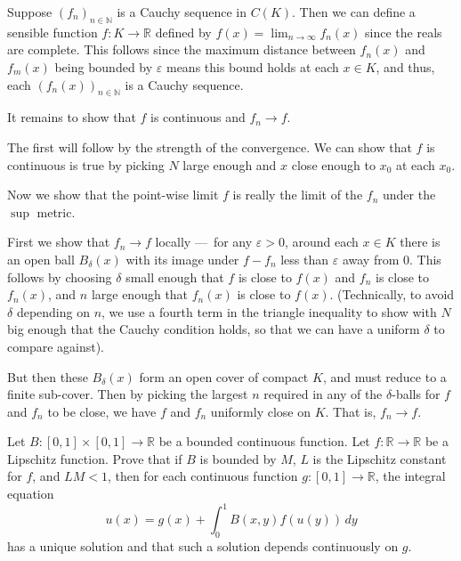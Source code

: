 \documentclass[12 pt, letterpaper]{hmcpset}
\begin{document}
\begin{solution}
	Suppose $(f_{n} )_{n \in \mathbb{N}}$ is a Cauchy sequence in $C(K)$. Then we can define a sensible function $f : K \to \mathbb{R}$ defined by $f(x) = \lim_{ n \to \infty } f_{n}(x)$ since the reals are complete. This follows since the maximum distance between $f_{n}(x)$ and $f_{m}(x)$ being bounded by $\varepsilon$ means this bound holds at each $x \in K$, and thus, each $(f_{n}(x))_{n \in \mathbb{N}}$ is a Cauchy sequence.

It remains to show that $f$ is continuous and $f_{n} \to f$. 

The first will follow by the strength of the convergence. We can show that $f$ is continuous is true by picking $N$ large enough and $x$ close enough to $x_{0}$ at each $x_{0}$. 

Now we show that the point-wise limit $f$ is really the limit of the $f_{n}$ under the $\sup$ metric.

First we show that $f_{n} \to f$ locally — for any $\varepsilon > 0$, around each $x \in K$ there is an open ball $B_{\delta}(x)$ with its image under $f - f_{n}$ less than $\varepsilon$ away from $0$. This follows by choosing $\delta$ small enough that $f$ is close to $f(x)$ and $f_{n}$ is close to $f_{n}(x)$, and $n$ large enough that $f_{n}(x)$ is close to $f(x)$. (Technically, to avoid $\delta$ depending on $n$, we use a fourth term in the triangle inequality to show with $N$ big enough that the Cauchy condition holds, so that we can have a uniform $\delta$ to compare against).

But then these $B_{\delta}(x)$ form an open cover of compact $K$, and must reduce to a finite sub-cover. Then by picking the largest $n$ required in any of the $\delta$-balls for $f$ and $f_{n}$ to be close, we have $f$ and $f_{n}$ uniformly close on $K$. That is, $f_{n} \to f$.
\end{solution}

\pagebreak

\begin{problem}[4.]
	Let $B : [0, 1] \times [0, 1] \to \mathbb{R}$ be a bounded continuous function. Let $f : \mathbb{R} \to \mathbb{R}$ be a Lipschitz function. Prove that if $B$ is bounded by $M$, $L$ is the Lipschitz constant for $f$, and $LM < 1$, then for each continuous function $g : [0, 1] \to \mathbb{R}$, the integral equation
	\[
		u(x) = g(x) + \int_{0}^{1} B(x, y) f(u(y)) \, dy
	\]
	has a unique solution and that such a solution depends continuously on $g$.
\end{problem}
\end{document}
